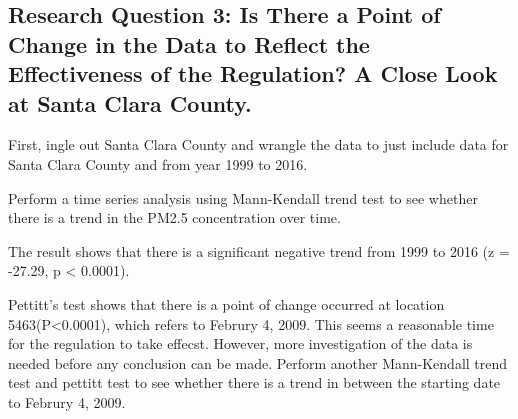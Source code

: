 \documentclass[12pt,]{article}
\newenvironment{Shaded}{\begin{snugshade}}{\end{snugshade}}
\newcommand{\KeywordTok}[1]{\textcolor[rgb]{0.13,0.29,0.53}{\textbf{#1}}}
\newcommand{\DecValTok}[1]{\textcolor[rgb]{0.00,0.00,0.81}{#1}}
\newcommand{\FloatTok}[1]{\textcolor[rgb]{0.00,0.00,0.81}{#1}}
\newcommand{\CommentTok}[1]{\textcolor[rgb]{0.56,0.35,0.01}{\textit{#1}}}
\newcommand{\OperatorTok}[1]{\textcolor[rgb]{0.81,0.36,0.00}{\textbf{#1}}}
\newcommand{\NormalTok}[1]{#1}
\begin{document}
\newpage

\subsection{Research Question 3: Is There a Point of Change in the Data
to Reflect the Effectiveness of the Regulation? A Close Look at Santa
Clara
County.}\label{research-question-3-is-there-a-point-of-change-in-the-data-to-reflect-the-effectiveness-of-the-regulation-a-close-look-at-santa-clara-county.}

First, ingle out Santa Clara County and wrangle the data to just include
data for Santa Clara County and from year 1999 to 2016.

Perform a time series analysis using Mann-Kendall trend test to see
whether there is a trend in the PM2.5 concentration over time.

\begin{Shaded}
\end{Shaded}

The result shows that there is a significant negative trend from 1999 to
2016 (z = -27.29, p \textless{} 0.0001).

\begin{Shaded}
\end{Shaded}

Pettitt's test shows that there is a point of change occurred at
location 5463(P\textless{}0.0001), which refers to Februry 4, 2009. This
seems a reasonable time for the regulation to take effecst. However,
more investigation of the data is needed before any conclusion can be
made. Perform another Mann-Kendall trend test and pettitt test to see
whether there is a trend in between the starting date to Februry 4,
2009.

\begin{Shaded}
\end{Shaded}
\end{document}
